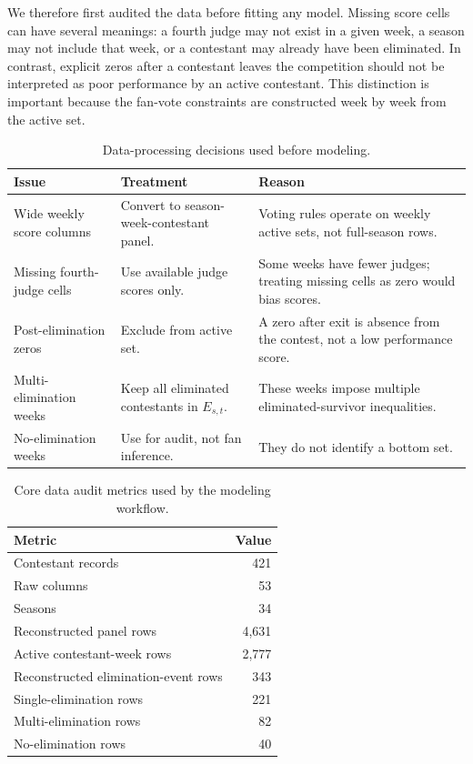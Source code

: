 \documentclass[12pt]{article}
\begin{document}
We therefore first audited the data before fitting any model. Missing score
cells can have several meanings: a fourth judge may not exist in a given week,
a season may not include that week, or a contestant may already have been
eliminated. In contrast, explicit zeros after a contestant leaves the
competition should not be interpreted as poor performance by an active
contestant. This distinction is important because the fan-vote constraints are
constructed week by week from the active set.

\begin{table}[H]
  \centering
  \caption{Data-processing decisions used before modeling.}
  \label{tab:data-decisions}
  \begin{tabularx}{0.96\linewidth}{lXX}
    \toprule
    Issue & Treatment & Reason \\
    \midrule
    Wide weekly score columns & Convert to season-week-contestant panel. &
    Voting rules operate on weekly active sets, not full-season rows. \\
    Missing fourth-judge cells & Use available judge scores only. & Some weeks
    have fewer judges; treating missing cells as zero would bias scores. \\
    Post-elimination zeros & Exclude from active set. & A zero after exit is
    absence from the contest, not a low performance score. \\
    Multi-elimination weeks & Keep all eliminated contestants in $E_{s,t}$. &
    These weeks impose multiple eliminated-survivor inequalities. \\
    No-elimination weeks & Use for audit, not fan inference. & They do not
    identify a bottom set. \\
    \bottomrule
  \end{tabularx}
\end{table}

\begin{table}[H]
  \centering
  \caption{Core data audit metrics used by the modeling workflow.}
  \label{tab:data-audit-core}
  \begin{tabular}{lr}
    \toprule
    Metric & Value \\
    \midrule
    Contestant records & 421 \\
    Raw columns & 53 \\
    Seasons & 34 \\
    Reconstructed panel rows & 4,631 \\
    Active contestant-week rows & 2,777 \\
    Reconstructed elimination-event rows & 343 \\
    Single-elimination rows & 221 \\
    Multi-elimination rows & 82 \\
    No-elimination rows & 40 \\
    \bottomrule
  \end{tabular}
\end{table}
\end{document}
